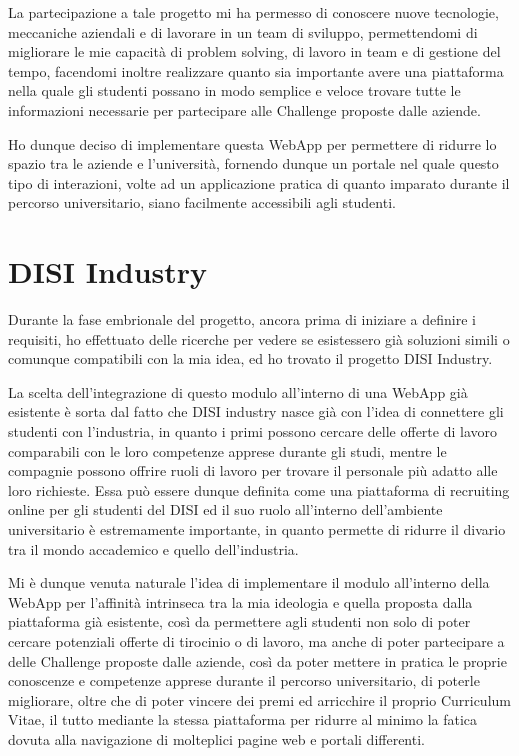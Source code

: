 La partecipazione a tale progetto mi ha permesso di conoscere nuove tecnologie, meccaniche aziendali e di lavorare in un team di sviluppo, permettendomi di migliorare le mie capacità di problem solving, di lavoro in team e di gestione del tempo, facendomi inoltre realizzare quanto sia importante avere una piattaforma nella quale gli studenti possano in modo semplice e veloce trovare tutte le informazioni necessarie per partecipare alle Challenge proposte dalle aziende.

Ho dunque deciso di implementare questa WebApp per permettere di ridurre lo spazio tra le aziende e l'università, fornendo dunque un portale nel quale questo tipo di interazioni, volte ad un applicazione pratica di quanto imparato durante il percorso universitario, siano facilmente accessibili agli studenti.



\section{DISI Industry}
\label{sec:context}
Durante la fase embrionale del progetto, ancora prima di iniziare a definire i requisiti, ho effettuato delle ricerche per vedere se esistessero già soluzioni simili o comunque compatibili con la mia idea, ed ho trovato il progetto DISI Industry.


La scelta dell'integrazione di questo modulo all'interno di una WebApp già esistente è sorta dal fatto che DISI industry nasce già con l'idea di connettere gli studenti con l'industria, in quanto i primi possono cercare delle offerte di lavoro comparabili con le loro competenze apprese durante gli studi, mentre le compagnie possono offrire ruoli di lavoro per trovare il personale più adatto alle loro richieste. Essa può essere dunque definita come una piattaforma di recruiting online per gli studenti del DISI ed il suo ruolo all'interno dell'ambiente universitario è estremamente importante, in quanto permette di ridurre il divario tra il mondo accademico e quello dell'industria. \cite{industry}

Mi è dunque venuta naturale l'idea di implementare il modulo all'interno della WebApp per l'affinità intrinseca tra la mia ideologia e quella proposta dalla piattaforma già esistente, così da permettere agli studenti non solo di poter cercare potenziali offerte di tirocinio o di lavoro, ma anche di poter partecipare a delle Challenge proposte dalle aziende, così da poter mettere in pratica le proprie conoscenze e competenze apprese durante il percorso universitario, di poterle migliorare, oltre che di poter vincere dei premi ed arricchire il proprio Curriculum Vitae, il tutto mediante la stessa piattaforma per ridurre al minimo la fatica dovuta alla navigazione di molteplici pagine web e portali differenti.



